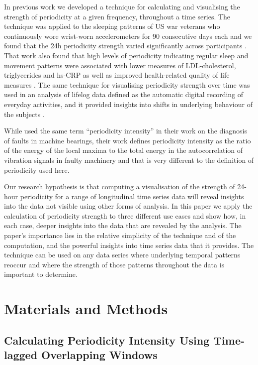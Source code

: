 \documentclass[preprints,article,accept,pdftex,moreauthors]{Definitions/mdpi}
\begin{document}
In previous work we  developed a technique for calculating and visualising the strength of periodicity at a given frequency, throughout a time series. The technique was applied to the sleeping patterns of US war veterans who continuously wore wrist-worn accelerometers for 90 consecutive days each and we found that the 24h periodicity strength varied significantly across participants \cite{buman2016behavioral}. 
%
That work also found that high levels of periodicity indicating regular sleep and movement patterns were associated with lower measures of LDL-cholesterol, triglycerides and hs-CRP as well as improved health-related quality of life measures \cite{buman2016behavioral}. 
The same technique for visualising periodicity strength over time was used in an analysis of lifelog data defined as the automatic digital recording of everyday activities, and it provided insights into shifts in underlying behaviour of the subjects  \cite{hu2016periodicity}. 

While \citeauthor{chegini2020new} \cite{chegini2020new} used the same term  ``periodicity intensity'' in their work on the diagnosis of faults in machine bearings, their work defines periodicity intensity as the ratio of the energy of the local maxima  to the total energy in the autocorrelation of vibration signals in faulty machinery and that is very different to the definition of periodicity used here.

{Our research hypothesis is that computing a visualisation of the strength of 24-hour periodicity for a range of longitudinal time series data will reveal insights into the data not visible using other forms of analysis.}
In this paper we apply the calculation of periodicity strength to three different use cases and show how, in each case, {deeper} insights into the data that are revealed by the analysis. The paper's importance lies in the relative simplicity of the technique and of the computation{,} and the powerful insights into time series data that it provides. The technique can be used on any data series where underlying temporal patterns reoccur and where the strength of those patterns throughout the data is important to {determine}.



\section{Materials and Methods}

\subsection{Calculating Periodicity Intensity Using Time-lagged Overlapping Windows}
\end{document}
